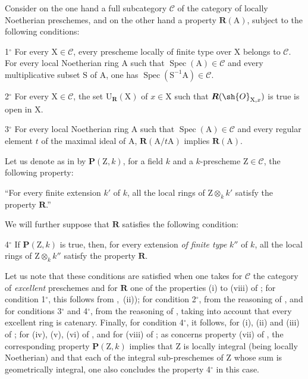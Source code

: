 \begin{env}[7.9.7]
\label{IV.7.9.7}
Consider on the one hand a full subcategory $\mathcal{C}$ of the category of locally Noetherian preschemes, and on the other hand a property $\boldsymbol{R}(\mathrm{A})$, subject to the following conditions:

1${}^\circ$ For every $\mathrm{X}\in\mathcal{C}$, every prescheme locally of finite type over $\mathrm{X}$ belongs to $\mathcal{C}$. For every local Noetherian ring $\mathrm{A}$ such that $\operatorname{Spec}(\mathrm{A})\in\mathcal{C}$ and every multiplicative subset $\mathrm{S}$ of $\mathrm{A}$, one has $\operatorname{Spec}(\mathrm{S}^{-1}\mathrm{A})\in\mathcal{C}$.

2${}^\circ$ For every $\mathrm{X}\in\mathcal{C}$, the set $\mathrm{U}_{\boldsymbol{R}}(\mathrm{X})$ of $x\in\mathrm{X}$ such that $\boldsymbol{R}(\sh{O}_{\mathrm{X},x})$ is true is open in $\mathrm{X}$.

3${}^\circ$ For every local Noetherian ring $\mathrm{A}$ such that $\operatorname{Spec}(\mathrm{A})\in\mathcal{C}$ and every regular element $t$ of the maximal ideal of $\mathrm{A}$, $\boldsymbol{R}(\mathrm{A}/t\mathrm{A})$ implies $\boldsymbol{R}(\mathrm{A})$.

Let us denote as in  by $\boldsymbol{P}(\mathrm{Z},k)$, for a field $k$ and a $k$-prescheme $\mathrm{Z}\in\mathcal{C}$, the following property:
\end{env}

``For every finite extension $k'$ of $k$, all the local rings of $\mathrm{Z}\otimes_k k'$ satisfy the property $\boldsymbol{R}$.''


We will further suppose that $\boldsymbol{R}$ satisfies the following condition:

4${}^\circ$ If $\boldsymbol{P}(\mathrm{Z},k)$ is true, then, for every extension \emph{of finite type} $k''$ of $k$, all the local rings of $\mathrm{Z}\otimes_k k''$ satisfy the property $\boldsymbol{R}$.

Let us note that these conditions are satisfied when one takes for $\mathcal{C}$ the category of \emph{excellent} preschemes and for $\boldsymbol{R}$ one of the properties (i) to (viii) of ; for condition 1${}^\circ$, this follows from ,~(ii)); for condition 2${}^\circ$, from the reasoning of , and for conditions 3${}^\circ$ and 4${}^\circ$, from the reasoning of , taking into account that every excellent ring is catenary. Finally, for condition 4${}^\circ$, it follows, for (i), (ii) and (iii) of ; for (iv), (v), (vi) of , and for (viii) of ; as concerns property (vii) of , the corresponding property $\boldsymbol{P}(\mathrm{Z},k)$ implies that $\mathrm{Z}$ is locally integral (being locally Noetherian) and that each of the integral sub-preschemes of $\mathrm{Z}$ whose sum is geometrically integral, one also concludes the property 4${}^\circ$ in this case.

